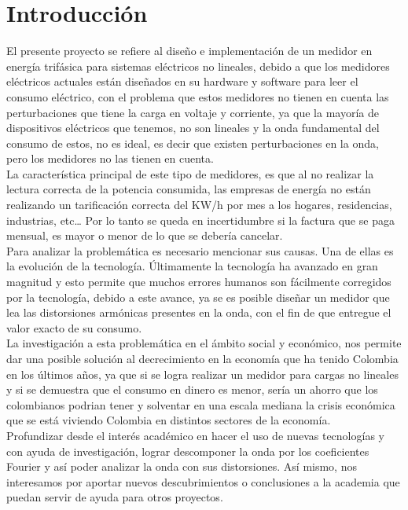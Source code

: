 \setcounter{page}{1}


\newpage{\clearpage}
\chapter{ Introducción}

El presente proyecto se refiere al diseño e implementación de un medidor en energía trifásica para sistemas eléctricos no lineales, debido a que los medidores eléctricos actuales están diseñados en su hardware y software para leer el consumo eléctrico, con el problema que estos medidores no tienen en cuenta las perturbaciones que tiene la carga en voltaje y corriente, ya que la mayoría de dispositivos eléctricos que tenemos, no son lineales y la onda fundamental del consumo de estos, no es ideal, es decir que existen perturbaciones en la onda, pero los medidores no las tienen en cuenta. \\

La característica principal de este tipo de medidores, es que al no realizar la lectura correcta de la potencia consumida, las empresas de energía no están realizando un tarificación correcta del KW/h por mes a los hogares, residencias, industrias, etc… Por lo tanto se queda en incertidumbre si la factura que se paga mensual, es mayor o menor de lo que se debería cancelar.\\

Para analizar la problemática es necesario mencionar sus causas. Una de ellas es la evolución de la tecnología. Últimamente la tecnología ha avanzado en gran magnitud y esto permite que muchos errores humanos son fácilmente corregidos por la tecnología, debido a este avance, ya se es posible diseñar un medidor que lea las distorsiones armónicas presentes en la onda, con el fin de que entregue el valor exacto de su consumo.\\

La investigación a esta problemática en el ámbito social y económico, nos permite dar una posible solución al decrecimiento en la economía que ha tenido Colombia en los últimos años, ya que si se logra realizar un medidor para cargas no lineales y si se demuestra que el consumo en dinero es menor, sería un ahorro que los colombianos podrian tener y solventar en una escala mediana la crisis económica que se está viviendo Colombia en distintos sectores de la economía.\\

Profundizar desde el interés académico en hacer el uso de nuevas tecnologías y con ayuda de investigación, lograr descomponer la onda por los coeficientes Fourier y así poder analizar la onda con sus distorsiones. Así mismo, nos interesamos por aportar nuevos descubrimientos o conclusiones a la academia que puedan servir de ayuda para otros proyectos.\\

